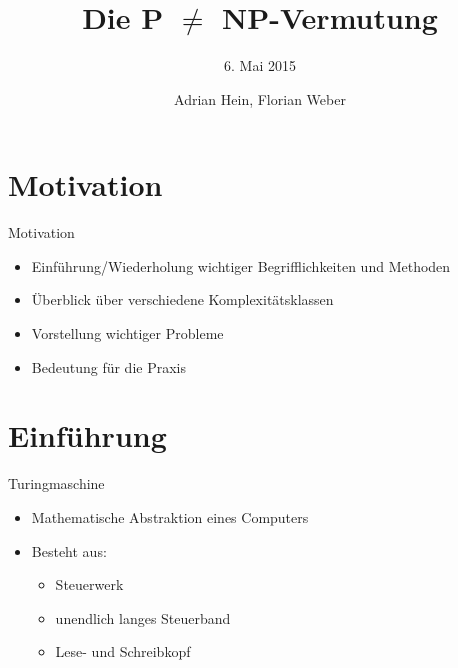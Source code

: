 \documentclass[ignorenonframetext,]{beamer}
\title{Die P $\neq$ NP-Vermutung}
\author{6. Mai 2015}
\date{Adrian Hein, Florian Weber}
\begin{document}
\frame{\titlepage}

\begin{frame}
\tableofcontents[hideallsubsections]
\end{frame}

\section{Motivation}\label{motivation}

\begin{frame}{Motivation}

\begin{itemize}
\itemsep1pt\parskip0pt
\item
  Einführung/Wiederholung wichtiger Begrifflichkeiten und Methoden
\item
  Überblick über verschiedene Komplexitätsklassen
\item
  Vorstellung wichtiger Probleme
\item
  Bedeutung für die Praxis
\end{itemize}

\end{frame}

\section{Einführung}\label{einfuxfchrung}

\begin{frame}{Turingmaschine}

\begin{itemize}
\itemsep1pt\parskip0pt
\item
  Mathematische Abstraktion eines Computers
\item
  Besteht aus:

  \begin{itemize}
  \itemsep1pt\parskip0pt
  \item
    Steuerwerk
  \item
    unendlich langes Steuerband
  \item
    Lese- und Schreibkopf
  \end{itemize}
\end{itemize}

\end{frame}
\end{document}
